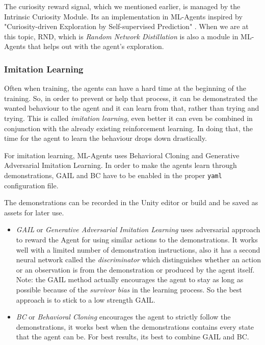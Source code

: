 \documentclass[a4paper, 12pt]{book}
\begin{document}
The curiosity reward signal, which we mentioned earlier, is managed by the Intrinsic Curiosity Module. Its an implementation in ML-Agents inspired by "Curiosity-driven Exploration by Self-supervised Prediction" \cite{CuriosityExploration}. When we are at this topic, RND, which is \emph{Random Network Distillation} \cite{ExplorationRND} is also a module in ML-Agents that helps out with the agent's exploration.

\subsubsection{Imitation Learning}

Often when training, the agents can have a hard time at the beginning of the training. So, in order to prevent or help that process, it can be demonstrated the wanted behaviour to the agent and it can learn from that, rather than trying and trying. This is called \emph{imitation learning}, even better it can even be combined in conjunction with the already existing reinforcement learning. In doing that, the time for the agent to learn the behaviour drops down drastically.

For imitation learning, ML-Agents uses Behavioral Cloning and Generative Adversarial Imitation Learning. In order to make the agents learn through demonstrations, GAIL and BC have to be enabled in the proper \texttt{yaml} configuration file.

The demonstrations can be recorded in the Unity editor or build and be saved as assets for later use.

\begin{itemize}
    \item \emph{GAIL} or \emph{Generative Adversarial Imitation Learning} \cite{GAIL} uses adversarial approach to reward the Agent for using similar actions to the demonstrations. It works well with a limited number of demonstration instructions, also it has a second neural network called the \emph{discriminator} which distinguishes whether an action or an observation is from the demonstration or produced by the agent itself. Note: the GAIL method actually encourages the agent to stay as long as possible because of the \emph{survivor bias} \cite{SurvivorBias} in the learning process. So the best approach is to stick to a low strength GAIL.
    \item \emph{BC} or \emph{Behavioral Cloning} encourages the agent to strictly follow the demonstrations, it works best when the demonstrations contains every state that the agent can be. For best results, its best to combine GAIL and BC.
\end{itemize}
\end{document}
